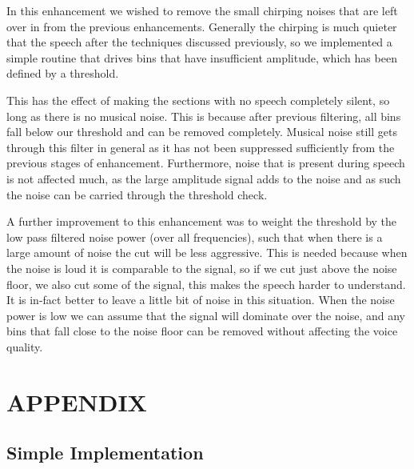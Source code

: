 \documentclass[11pt]{article} %
\begin{document}
In this enhancement we wished to remove the small chirping noises that are left over in from the previous enhancements. Generally the chirping is much quieter that the speech after the techniques discussed previously, so we implemented a simple routine that drives bins that have insufficient amplitude, which has been defined by a threshold. 

This has the effect of making the sections with no speech completely silent, so long as there is no musical noise. This is because after previous filtering, all bins fall below our threshold and can be removed completely. Musical noise still gets through this filter in general as it has not been suppressed sufficiently from the previous stages of enhancement. Furthermore, noise that is present during speech is not affected much, as the large amplitude signal adds to the noise and as such the noise can be carried through the threshold check. 

A further improvement to this enhancement was to weight the threshold by the low pass filtered noise power (over all frequencies), such that when there is a large amount of noise the cut will be less aggressive. This is needed because when the noise is loud it is comparable to the signal, so if we cut just above the noise floor, we also cut some of the signal, this makes the speech harder to understand. It is in-fact better to leave a little bit of noise in this situation. When the noise power is low we can assume that the signal will dominate over the noise, and any bins that fall close to the noise floor can be removed without affecting the voice quality.  


\clearpage

\section{APPENDIX}
\renewcommand{\thesubsection}{\Alph{subsection}}
\subsection{Simple Implementation} 
\label{app:simple}
\end{document}
